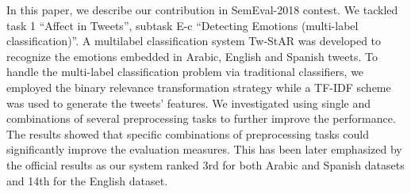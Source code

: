 In this paper, we describe our contribution in SemEval-2018 contest. We tackled task 1 ``Affect in Tweets'', subtask E-c ``Detecting Emotions (multi-label classification)''. A multilabel classification system Tw-StAR was developed to recognize the emotions embedded in Arabic, English and Spanish tweets. To handle the multi-label classification problem via traditional classifiers, we employed the binary relevance transformation strategy while a TF-IDF scheme was used to generate the tweets' features. We investigated using single and combinations of several preprocessing tasks to further improve the performance. The results showed that specific combinations of preprocessing tasks could significantly improve the evaluation measures. This has been later emphasized by the official results as our system ranked 3rd for both Arabic and Spanish datasets and 14th for the English dataset.
